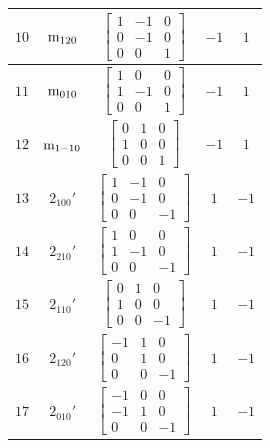 \documentclass[fleqn,8pt]{jsarticle}
\begin{document}
\begin{longtable}{ccccc}
$ 10 $ & $ {\rm m}_{120} $ & $ \begin{bmatrix} 1 & -1 & 0 \\ 0 & -1 & 0 \\ 0 & 0 & 1 \end{bmatrix} $ & $ -1 $ & $ 1 $ \\ \hline
$ 11 $ & $ {\rm m}_{010} $ & $ \begin{bmatrix} 1 & 0 & 0 \\ 1 & -1 & 0 \\ 0 & 0 & 1 \end{bmatrix} $ & $ -1 $ & $ 1 $ \\ \hline
$ 12 $ & $ {\rm m}_{1-10} $ & $ \begin{bmatrix} 0 & 1 & 0 \\ 1 & 0 & 0 \\ 0 & 0 & 1 \end{bmatrix} $ & $ -1 $ & $ 1 $ \\ \hline
$ 13 $ & $ 2{}_{100}{}' $ & $ \begin{bmatrix} 1 & -1 & 0 \\ 0 & -1 & 0 \\ 0 & 0 & -1 \end{bmatrix} $ & $ 1 $ & $ -1 $ \\ \hline
$ 14 $ & $ 2{}_{210}{}' $ & $ \begin{bmatrix} 1 & 0 & 0 \\ 1 & -1 & 0 \\ 0 & 0 & -1 \end{bmatrix} $ & $ 1 $ & $ -1 $ \\ \hline
$ 15 $ & $ 2{}_{110}{}' $ & $ \begin{bmatrix} 0 & 1 & 0 \\ 1 & 0 & 0 \\ 0 & 0 & -1 \end{bmatrix} $ & $ 1 $ & $ -1 $ \\ \hline
$ 16 $ & $ 2{}_{120}{}' $ & $ \begin{bmatrix} -1 & 1 & 0 \\ 0 & 1 & 0 \\ 0 & 0 & -1 \end{bmatrix} $ & $ 1 $ & $ -1 $ \\ \hline
$ 17 $ & $ 2{}_{010}{}' $ & $ \begin{bmatrix} -1 & 0 & 0 \\ -1 & 1 & 0 \\ 0 & 0 & -1 \end{bmatrix} $ & $ 1 $ & $ -1 $ \\ \hline

\end{longtable}
\end{document}
